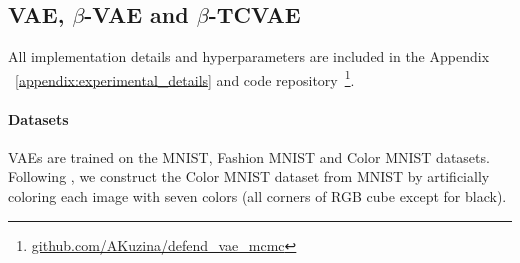 
\subsection{VAE, $\beta$-VAE and $\beta$-TCVAE} %
All implementation details and hyperparameters are included in the Appendix ~\ref{appendix:experimental_details} and code repository~\footnote{\url{github.com/AKuzina/defend_vae_mcmc}}. 
\paragraph{Datasets}
VAEs are trained on the MNIST, Fashion MNIST \cite{xiao2017fashion} and Color MNIST datasets. Following \cite{Cemgil2019-vn}, we construct the Color MNIST dataset from MNIST by artificially coloring each image with seven colors (all corners of RGB cube except for black). 

